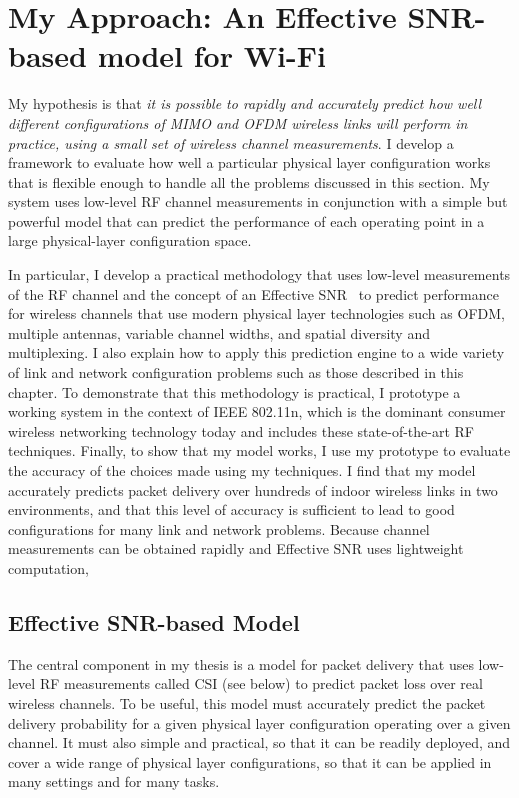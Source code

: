 \section{My Approach: An Effective SNR-based model for Wi-Fi}
My hypothesis is that \emph{it is possible to rapidly and accurately predict how well different configurations of MIMO and OFDM wireless links will perform in practice, using a small set of wireless channel measurements}. I develop a framework to evaluate how well a particular physical layer configuration works that is flexible enough to handle all the problems discussed in this section. My system uses low-level RF channel measurements in conjunction with a simple but powerful model that can predict the performance of each operating point in a large physical-layer configuration space.

In particular, I develop a practical methodology that uses low-level measurements of the RF channel and the concept of an Effective SNR~\cite{Nanda_EffectiveSNR} to predict performance for wireless channels that use modern physical layer technologies such as OFDM, multiple antennas, variable channel widths, and spatial diversity and multiplexing. I also explain how to apply this prediction engine to a wide variety of link and network configuration problems such as those described in this chapter. To demonstrate that this methodology is practical, I prototype a working system in the context of IEEE 802.11n, which is the dominant consumer wireless networking technology today and includes these state-of-the-art RF techniques. Finally, to show that my model works, I use my prototype to evaluate the accuracy of the choices made using my techniques. I find that my model accurately predicts packet delivery over hundreds of indoor wireless links in two environments, and that this level of accuracy is sufficient to lead to good configurations for many link and network problems. Because channel measurements can be obtained rapidly and Effective SNR uses lightweight computation, 

\subsection{Effective SNR-based Model}
The central component in my thesis is a model for packet delivery that uses low-level RF measurements called CSI (see  below) to predict packet loss over real wireless channels. To be useful, this model must accurately predict the packet delivery probability for a given physical layer configuration operating over a given channel. It must also simple and practical, so that it can be readily deployed, and cover a wide range of physical layer configurations, so that it can be applied in many settings and for many tasks.


